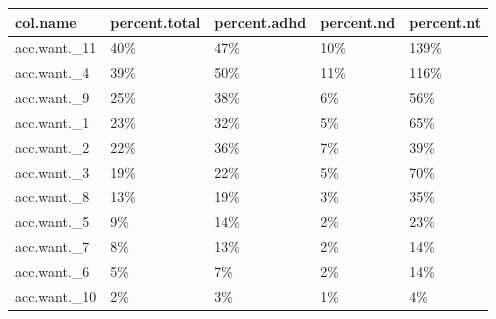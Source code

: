 \begin{table}[ht]
\centering
\begin{tabular}{lllll}
  \hline
col.name & percent.total & percent.adhd & percent.nd & percent.nt \\ 
  \hline
acc.want.\_11 & 40\% & 47\% & 10\% & 139\% \\ 
  acc.want.\_4 & 39\% & 50\% & 11\% & 116\% \\ 
  acc.want.\_9 & 25\% & 38\% & 6\% & 56\% \\ 
  acc.want.\_1 & 23\% & 32\% & 5\% & 65\% \\ 
  acc.want.\_2 & 22\% & 36\% & 7\% & 39\% \\ 
  acc.want.\_3 & 19\% & 22\% & 5\% & 70\% \\ 
  acc.want.\_8 & 13\% & 19\% & 3\% & 35\% \\ 
  acc.want.\_5 & 9\% & 14\% & 2\% & 23\% \\ 
  acc.want.\_7 & 8\% & 13\% & 2\% & 14\% \\ 
  acc.want.\_6 & 5\% & 7\% & 2\% & 14\% \\ 
  acc.want.\_10 & 2\% & 3\% & 1\% & 4\% \\ 
   \hline
\end{tabular}
\end{table}
